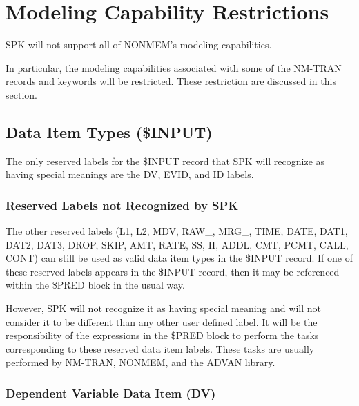 \documentclass{article}
\begin{document}
%
\section{Modeling Capability Restrictions}
%

SPK will not support all of NONMEM's modeling capabilities.

In particular, the modeling capabilities associated with some 
of the NM-TRAN records and keywords will be restricted.
These restriction are discussed in this section.


\subsection{Data Item Types (\$INPUT)}

The only reserved labels for the \$INPUT record that SPK will
recognize as having special meanings are the DV, EVID, and
ID labels.


\subsubsection{Reserved Labels not Recognized by SPK}

The other reserved labels
(L1, L2, MDV, RAW\_, MRG\_, TIME, DATE, DAT1, DAT2, DAT3, 
DROP, SKIP, AMT, RATE, SS, II, ADDL, CMT, PCMT, CALL, CONT)
can still be used as valid 
data item types in the \$INPUT record.
If one of these reserved labels appears in the \$INPUT record, 
then it may  be referenced within the \$PRED block in the usual way.

However, SPK will not recognize it as having special meaning and will
not consider it to be different than any other user defined label.
It will be the responsibility of the expressions in the \$PRED block to 
perform the tasks corresponding to these reserved data item labels.
These tasks are usually performed by NM-TRAN, NONMEM, and the
ADVAN library.


\subsubsection{Dependent Variable Data Item (DV)}
\end{document}
